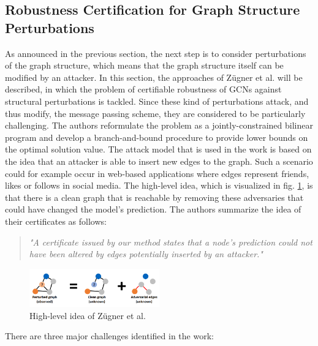 \documentclass[a4paper,preprint]{sig-alternate}
\begin{document}
\subsection{Robustness Certification for Graph Structure Perturbations}
\label{sec:paper_three}

As announced in the previous section, the next step is to consider perturbations of the graph structure,
which means that the graph structure itself can be modified by an attacker.
In this section, the approaches of Zügner et al. \cite{10.1145/3394486.3403217} will be described, in which the
problem of certifiable robustness of GCNs against structural perturbations is tackled. 
Since these kind of perturbations attack, and thus modify, the message passing scheme, they are considered to be particularly challenging. \cite{10.1145/3394486.3403217} 
The authors reformulate the problem as a jointly-constrained bilinear program and develop a branch-and-bound procedure 
to provide lower bounds on the optimal solution value. The attack model that is used in the work is based on the idea that an attacker 
is able to insert new edges to the graph. Such a scenario could for example occur in web-based applications where edges represent friends, 
likes or follows in social media. \cite{10.1145/3394486.3403217}
The high-level idea, which is visualized in fig. \ref{fig:high_level}, is that there is a clean graph that is reachable by removing
these adversaries that could have changed the model's prediction.
The authors summarize the idea of their certificates as follows:
\begin{quote}
    \emph{"A certificate issued by our method states that a node's prediction could not have been altered by edges potentially
    inserted by an attacker."} \cite{10.1145/3394486.3403217}
\end{quote}

\begin{figure}[h]
    \centering
    \includegraphics[width=0.5\textwidth]{img/high_level_graph_pert.png}
    \caption{High-level idea of Zügner et al. \cite{10.1145/3394486.3403217}}
    \label{fig:high_level}
\end{figure}

\vfill
\pagebreak

There are three major challenges identified in the work:
\end{document}
